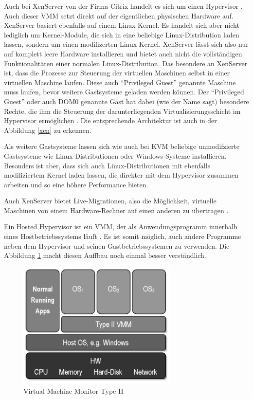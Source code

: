 Auch bei XenServer von der Firma Citrix handelt es sich um einen Hypervisor \citep[Vgl.][]{xen:001}. Auch dieser \ac{VMM} setzt direkt auf der eigentlichen physischen Hardware auf. XenServer basiert ebenfalls auf einem Linux-Kernel. Es handelt sich aber nicht lediglich um Kernel-Module, die sich in eine beliebige Linux-Distribution laden lassen, sondern um einen modifizerten Linux-Kernel. XenServer lässt sich also nur auf komplett leere Hardware installieren und bietet auch nicht die vollständigen Funktionalitäten einer normalen Linux-Distribution. Das besondere an XenServer ist, dass die Prozesse zur Steuerung der virtuellen Maschinen selbst in einer virtuellen Maschine laufen. Diese auch "`Privileged Guest"' genannte Maschine muss laufen, bevor weitere Gastsysteme geladen werden können. Der "`Privileged Guest"' oder auch DOM0 genannte Gast hat dabei (wie der Name sagt) besondere Rechte, die ihm die Steuerung der darunterliegenden Virtualisierungsschicht im Hypervisor ermöglichen \citep[Vgl.][S. 2]{Schee14}. Die entsprechende Architektur ist auch in der Abbildung \ref{xen} zu erkennen.

Als weitere Gastsysteme lassen sich wie auch bei KVM beliebige unmodifzierte Gastsysteme wie Linux-Distributionen oder Windows-Systeme installieren. Besonders ist aber, dass sich auch Linux-Distributionen mit ebenfalls modifiziertem Kernel laden lassen, die direkter mit dem Hypervisor zusammen arbeiten und so eine höhere Performance bieten.

Auch XenServer bietet Live-Migrationen, also die Möglichkeit, virtuelle Maschinen von einem Hardware-Rechner auf einen anderen zu übertragen \citep[Vgl.][]{xen:002}.


Ein Hosted Hypervisor ist ein \ac{VMM}, der als Anwendungsprogramm innerhalb eines Hostbetriebssystems läuft \citep[Vgl.][S. 22 ff.]{Goldberg73}. Es ist somit möglich, auch andere Programme neben dem Hypervisor und seinen Gastbetriebssystemen zu verwenden. Die Abbildung \ref{hosted} macht diesen Auffbau noch einmal besser verständlich.

\begin{figure}[!ht]
  \begin{center}
    \includegraphics[width=8cm]{bilder/VMM-Type2.jpg}
    \caption{Virtual Machine Monitor Type II \citep{wiki:003}}
    \label{hosted}
  \end{center}
\end{figure}

